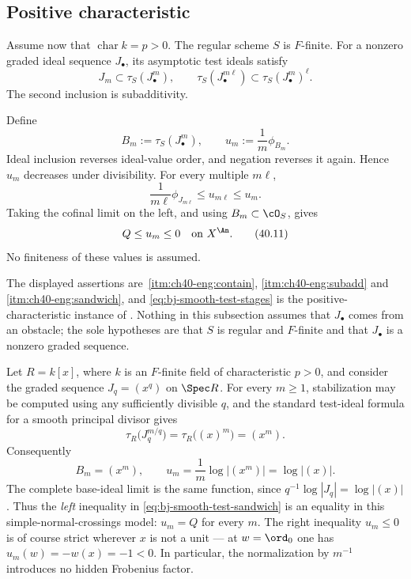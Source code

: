 \subsection{Positive characteristic}
\label{sec:ch40-char-p}

Assume now that $\operatorname{char}k=p>0$.  The regular scheme $S$ is
$F$-finite.  For a nonzero graded ideal sequence $J_\bullet$, its
asymptotic test ideals satisfy
\[
 J_m\subset\tau_S(J_\bullet^m),\qquad
 \tau_S(J_\bullet^{m\ell})
       \subset\tau_S(J_\bullet^m)^\ell.
\tag{40.9}\label{eq:bj-test-ideal-properties}
\]
The second inclusion is subadditivity.

Define
\[
 B_m:=\tau_S(J_\bullet^m),\qquad
 u_m:=\frac1m\phi_{B_m}.
\tag{40.10}\label{eq:bj-smooth-test-stages}
\]
Ideal inclusion reverses ideal-value order, and negation reverses it again.  Hence $u_m$
decreases under divisibility.  For every multiple $m\ell$,
\[
 \frac1{m\ell}\phi_{J_{m\ell}}
       \le u_{m\ell}\le u_m .
\]
Taking the cofinal limit on the left, and using $B_m\subset\cO_S$, gives
\[
                            Q\le u_m\le0
                            \quad\text{on }X^{\An}.
\tag{40.11}\label{eq:bj-smooth-test-sandwich}
\]
No finiteness of these values is assumed.

The displayed assertions are
\,\cref{itm:ch40-eng:contain},
\cref{itm:ch40-eng:subadd} and \cref{itm:ch40-eng:sandwich}, and
\eqref{eq:bj-smooth-test-stages} is the positive-characteristic instance of
.  Nothing in this subsection assumes that
$J_\bullet$ comes from an obstacle; the sole hypotheses are that $S$ is
regular and $F$-finite and that $J_\bullet$ is a nonzero graded
sequence.

\begin{example}
\label{ex:ch40-smooth-parameter}
Let $R=k[x]$, where $k$ is an $F$-finite field of characteristic
$p>0$, and consider the graded sequence $J_q=(x^q)$ on
$\Spec R$.  For every $m\geq1$, stabilization may be computed using any
sufficiently divisible $q$, and the standard test-ideal formula for a
smooth principal divisor \cite{ST12} gives
\[
       \tau_R\bigl(J_q^{m/q}\bigr)
          =\tau_R\bigl((x)^m\bigr)=(x^m).
\]
Consequently
\[
       B_m=(x^m),\qquad
       u_m=\frac1m\log|(x^m)|=\log|(x)|.
\]
The complete base-ideal limit is the same function, since
$q^{-1}\log|J_q|=\log|(x)|$.  Thus the \emph{left} inequality in
\eqref{eq:bj-smooth-test-sandwich} is an equality in this
simple-normal-crossings model: $u_m=Q$ for every $m$.  The right
inequality $u_m\le0$ is of course strict wherever $x$ is not a unit ---
at $w=\ord_0$ one has $u_m(w)=-w(x)=-1<0$.  In particular, the normalization by $m^{-1}$ introduces
no hidden Frobenius factor.
\end{example}

